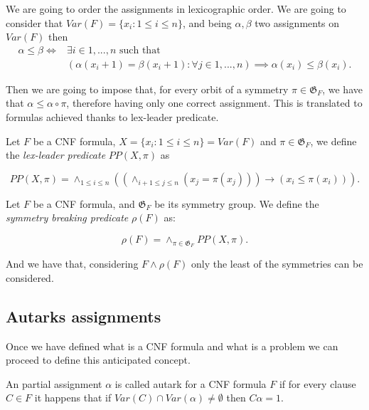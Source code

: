 We are going to order the assignments in  lexicographic order. We are going to consider that $Var(F) = \{x_i : 1 \le i \le n\}$, and being $\alpha, \beta$ two assignments on $Var(F)$ then
\begin{align*} 
  \alpha \le \beta \iff& \exists i \in 1,...,n \text{ such that }\\  &(\alpha(x_i+1) = \beta(x_i+1):\forall j \in 1,...,n  ) \implies\alpha( x_i) \le\beta (x_i).
\end{align*}
    
Then we are going to impose that, for every orbit of a symmetry $\pi \in \mathfrak{G}_F$, we have that $\alpha\le \alpha\circ\pi$, therefore having only one correct assignment. This is translated to formulas achieved thanks to lex-leader predicate.


\begin{definition}

  Let $F$ be a CNF formula, $X=\{x_i: 1\le i \le n\}=Var(F)$ and $\pi \in \mathfrak{G}_F$, we define the \emph{lex-leader predicate} $PP(X,\pi)$ as

  $$PP(X,\pi) = \land_{1\le i \le n} \left (\left (
    \land_{i+1 \le j \le n} (x_j = \pi(x_j)) \right )  \to (x_i \le \pi(x_i) )\right ).$$
\end{definition}


\begin{definition}

  Let $F$ be a CNF formula, and $\mathfrak{G}_F$ be its symmetry group. We define the \emph{symmetry breaking predicate} $\rho(F)$ as:

  $$ \rho(F)  = \land_{\pi \in \mathfrak{G}_F} PP(X,\pi).$$

\end{definition}


And we have that, considering $F\land \rho(F)$ only the least of the symmetries can be considered. 





 
\subsection{Autarks assignments}
\label{sec:autark}

Once we have defined what is a CNF formula and what is a problem we can proceed to define this anticipated concept.

\begin{definition}
  An partial assignment $\alpha$ is called autark for a CNF formula $F$ if for every clause $C \in F$ it happens that if $Var(C) \cap Var(\alpha) \ne \emptyset $ then $C\alpha = 1$.
\end{definition}

